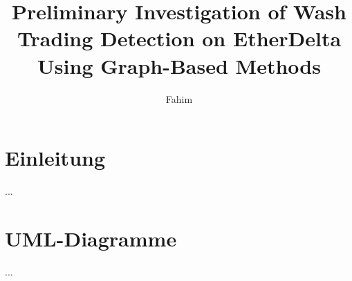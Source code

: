 \documentclass[
	language=english,	%
	thesis=bachelor,		%
	printmode,			%
	draft,				%
	onesided,			%
	nosecondtitle,		%
	compactlistof,		%
	lotbeforelof,		%
	noauthorship,		%
	colorlinks=false,	%
	graduatedtoc,		%
	captionstyle=flat,	%
	smallromans,		%
	glossaryhref=false,	%
	acronymhref=false,	%
	acronymdots=false,	%
	symbolshref=false,	%
	symbolsdots=false,	%
	fancy,				%
	theorembelow,		%
	theoremdelim=:,		%
	sansmath,			%
	noautobuild,		%
	faculty=cb			%
]{hsmw-thesis}
\title{Preliminary Investigation of Wash Trading Detection on EtherDelta Using Graph-Based Methods}
\author{Fahim}{Rafique}[B.Sc.]<signatur-schildbach.pdf>
\begin{document}
	\chapter{Einleitung}
	...
	
	\appendix %
	\chapter{UML-Diagramme}
	...
\end{document}
